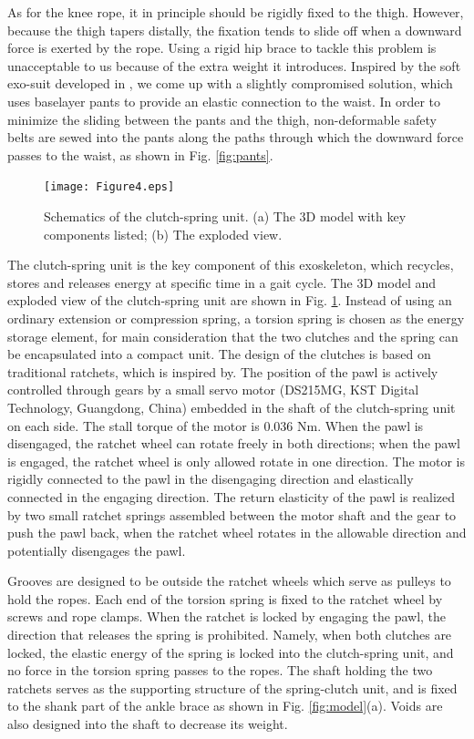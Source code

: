\documentclass[twocolumn,cleanfoot,10pt]{asme2ej}
\begin{document}
As for the knee rope, it in principle should be rigidly fixed to the thigh.
However, because the thigh tapers distally, the fixation tends to slide off when a downward force is exerted by the rope.
Using a rigid hip brace to tackle this problem is unacceptable to us because of the extra weight it introduces.
Inspired by the soft exo-suit developed in \cite{RN20}, we come up with a slightly compromised solution, which uses baselayer pants to provide an elastic connection to the waist.
In order to minimize the sliding between the pants and the thigh, non-deformable safety belts are sewed into the pants along the paths through which the downward force passes to the waist, as shown in Fig. \ref{fig:pants}.

\begin{figure}[t]
	\centering
	\texttt{[image: Figure4.eps]}
	\caption{Schematics of the clutch-spring unit. (a) The 3D model with key components listed; (b) The exploded view.}
	\label{fig:clutch}   
\end{figure}

The clutch-spring unit is the key component of this exoskeleton, which recycles, stores and releases energy at specific time in a gait cycle.
The 3D model and exploded view of the clutch-spring unit are shown in Fig. \ref{fig:clutch}.
Instead of using an ordinary extension or compression spring, a torsion spring is chosen as the energy storage element, for main consideration that the two clutches and the spring can be encapsulated into a compact unit.
The design of the clutches is based on traditional ratchets, which is inspired by\cite{RN19}.
The position of the pawl is actively controlled through gears by a small servo motor (DS215MG, KST Digital Technology, Guangdong, China) embedded in the shaft of the clutch-spring unit on each side.
The stall torque of the motor is 0.036 Nm.
When the pawl is disengaged, the ratchet wheel can rotate freely in both directions; when the pawl is engaged, the ratchet wheel is only allowed rotate in one direction.
The motor is rigidly connected to the pawl in the disengaging direction and elastically connected in the engaging direction.
The return elasticity of the pawl is realized by two small ratchet springs assembled between the motor shaft and the gear to push the pawl back, when the ratchet wheel rotates in the allowable direction and potentially disengages the pawl.

Grooves are designed to be outside the ratchet wheels which serve as pulleys to hold the ropes.
Each end of the torsion spring is fixed to the ratchet wheel by screws and rope clamps.
When the ratchet is locked by engaging the pawl, the direction that releases the spring is prohibited. 
Namely, when both clutches are locked, the elastic energy of the spring is locked into the clutch-spring unit, and no force in the torsion spring passes to the ropes.
The shaft holding the two ratchets serves as the supporting structure of the spring-clutch unit, and is fixed to the shank part of the ankle brace as shown in Fig. \ref{fig:model}(a).
Voids are also designed into the shaft to decrease its weight.
\end{document}

